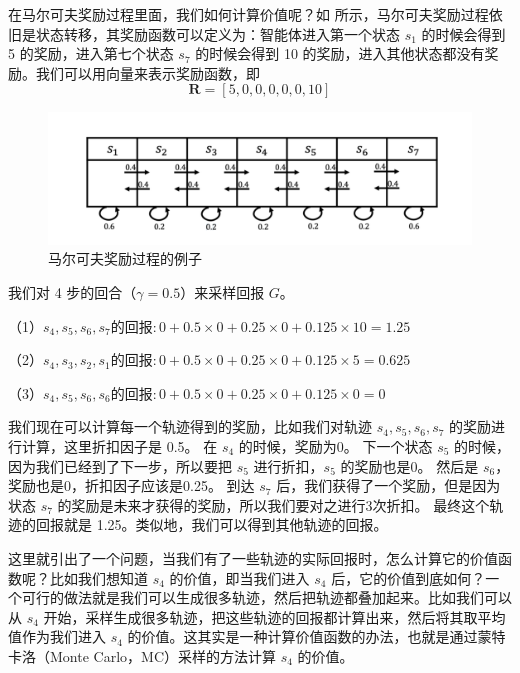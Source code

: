 在马尔可夫奖励过程里面，我们如何计算价值呢？如 所示，马尔可夫奖励过程依旧是状态转移，其奖励函数可以定义为：智能体进入第一个状态 $s_1$ 的时候会得到 5 的奖励，进入第七个状态 $s_7$ 的时候会得到 10 的奖励，进入其他状态都没有奖励。我们可以用向量来表示奖励函数，即
\begin{equation}
  \label{eq:}
  \boldsymbol{R}=[5,0,0,0,0,0,10]
\end{equation}

\begin{figure}[hbt]
  \centering
  \includegraphics[width=0.7\linewidth]{res/ch2/2.11}
  \caption{马尔可夫奖励过程的例子}
  \label{fig:fig2.11}
\end{figure}

我们对 4 步的回合（$\gamma=0.5$）来采样回报 $G$。

  （1）$s_{4}, s_{5}, s_{6}, s_{7} \text{的回报}: 0+0.5\times 0+0.25 \times 0+ 0.125\times 10=1.25$

  （2）$s_{4}, s_{3}, s_{2}, s_{1} \text{的回报}: 0+0.5 \times 0+0.25\times 0+0.125 \times 5=0.625$

  （3）$s_{4}, s_{5}, s_{6}, s_{6} \text{的回报}: 0+0.5\times 0 +0.25 \times 0+0.125 \times 0=0$

我们现在可以计算每一个轨迹得到的奖励，比如我们对轨迹 $s_4,s_5,s_6,s_7$ 的奖励进行计算，这里折扣因子是 0.5。
在 $s_4$ 的时候，奖励为0。
下一个状态 $s_5$ 的时候，因为我们已经到了下一步，所以要把 $s_5$ 进行折扣，$s_5$ 的奖励也是0。
然后是 $s_6$，奖励也是0，折扣因子应该是0.25。
到达 $s_7$ 后，我们获得了一个奖励，但是因为状态 $s_7$ 的奖励是未来才获得的奖励，所以我们要对之进行3次折扣。
最终这个轨迹的回报就是 1.25。类似地，我们可以得到其他轨迹的回报。

这里就引出了一个问题，当我们有了一些轨迹的实际回报时，怎么计算它的价值函数呢？比如我们想知道 $s_4$ 的价值，即当我们进入 $s_4$ 后，它的价值到底如何？一个可行的做法就是我们可以生成很多轨迹，然后把轨迹都叠加起来。比如我们可以从 $s_4$ 开始，采样生成很多轨迹，把这些轨迹的回报都计算出来，然后将其取平均值作为我们进入 $s_4$ 的价值。这其实是一种计算价值函数的办法，也就是通过蒙特卡洛（Monte Carlo，MC）采样的方法计算 $s_4$ 的价值。
